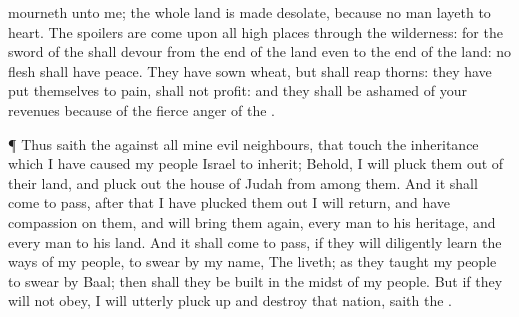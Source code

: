 {mourneth unto me; the whole
land is made
desolate, because no
man
layeth
{} to
heart.
The
spoilers are
come upon all high
places through the
wilderness: for the
sword of the
{} shall
devour from the
{}
end of the
land even to the
{}
end of the
land: no
flesh shall have
peace.
They have
sown
wheat, but shall
reap
thorns: they have put themselves to
pain,
{} shall not
profit: and they shall be
ashamed of your
revenues because of the
fierce
anger of the
{}.
\par }{\PP {}¶ Thus
saith the
{} against all mine
evil
neighbours, that
touch the
inheritance which I have caused my
people
Israel to
inherit; Behold, I will pluck them
out of their
land, and pluck
out the
house of
Judah from
among them.
And it shall come to pass,
after that I have plucked them
out I will
return, and have
compassion on them, and will bring them
again, every
man to his
heritage, and every
man to his
land.
And it shall come to pass, if they will
diligently
learn the
ways of my
people, to
swear by my
name, The
{}
liveth; as they
taught my
people to
swear by
Baal; then shall they be
built in the
midst of my
people.
But if they will not
obey, I will
utterly pluck
up and
destroy that
nation,
saith the
{}.

}
